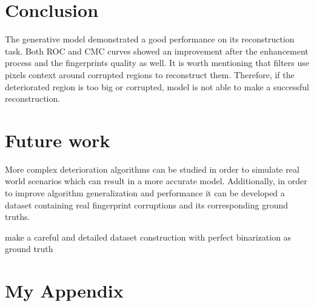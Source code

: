\documentclass[a4paper,fleqn]{cas-dc}
\begin{document}
\section{Conclusion}
\label{sec:CON}

The generative model demonstrated a good performance on its reconstruction task. Both ROC and CMC curves showed an improvement after the enhancement process and the fingerprints quality as well. It is worth mentioning that filters use pixels context around corrupted regions to reconstruct them. Therefore, if the deteriorated region is too big or corrupted, model is not able to make a successful reconstruction. 

\section{Future work}
\label{sec:FW}

More complex deterioration algorithms can be studied in order to simulate real world scenarios which can result in a more accurate model. Additionally, in order to improve algorithm generalization and performance it can be developed a dataset containing real fingerprint corruptions and its corresponding ground truths.

make a careful and detailed dataset construction with perfect binarization as ground truth

\appendix
\section{My Appendix}
\end{document}
